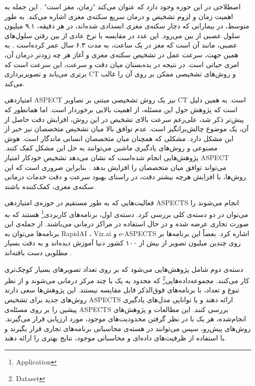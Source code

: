 اصطلاحی در این حوزه وجود دارد که عنوان می‌کند "زمان، مغز است" \cite{saver2006time}.
این جمله به اهمیت زمان و لزوم تشخیص و درمان سریع سکته‌ی مغزی اشاره می‌کند.
به طور متوسط، در بیمارانی که دچار سکته‌ی مغزی انسدادی شده‌اند، در هر دقیقه، ۹.۱ میلیون سلول عصبی از بین می‌رود.
این عدد در مقایسه با نرخ عادی از بین رفتن سلول‌های عصبی، مانند آن است که مغز در یک ساعت، به مدت ۶.۳ سال عمر کرده‌است \cite{saver2006time}.
به همین جهت، سرعت عمل در تشخیص سکته‌ی مغزی و آغاز هر چه زودتر درمان آن، امری حیاتی است.
در نتیجه در بده‌بستان میان دقت و سرعت، این سرعت است که برتری می‌یابد و تصویربرداری CT و روش‌های تشخیصی ممکن بر روی آن را غالب می‌کند.

امتیازدهی ASPECT نیز یک روش تشخیصی مبتنی بر تصاویر CT است.
به همین دلیل است که پژوهش حول این مسئله، از اهمیت بالایی برخوردار است.
اما همانطور که پیش‌تر ذکر شد، علی‌رغم سرعت بالای تشخیص در این روش، افزایش دقت حاصل از آن، یک موضوع چالش‌برانگیز است.
عدم توافق بالا میان تشخیص متخصصان نیز خبر از این مشکل دارد.
مشکلی که همچنان میان متخصصان انسانی ماندگار است.
هوش مصنوعی و روش‌های یادگیری ماشین می‌توانند به حل این مشکل کمک کنند.
پژوهش‌هایی انجام شده‌است
که نشان می‌دهد تشخیص خودکار امتیاز ASPECT می‌تواند توافق میان متخصصان را افزایش بدهد \cite{chen2022improving}.
بنابراین ضروری است که این روش‌ها، با افزایش هرچه بیشتر دقت، در راستای بهبود سرعت و دقت خدمات درمانی سکته‌ی مغزی، کمک‌کننده باشند.


فعالیت‌هایی که به طور مستقیم در حوزه‌ی امتیازدهی ASPECTS انجام می‌شوند را می‌توان در دو دسته‌ی کلی بررسی کرد.
دسته‌ی اول، 
برنامه‌های کاربردی\footnote{Application} هستند 
که به صورت تجاری عرضه شده و در حال استفاده در مراکز درمانی می‌باشند.
از جمله‌ی این برنامه‌ها می‌توان به RapidAI \cite{rapidai}،
 Viz.ai \cite{vizai} و e-ASPECTS \cite{brainomix} اشاره کرد.
بعضاً این برنامه‌ها بر روی چندین میلیون تصویر از بیش از ۱۰۰ کشور دنیا آموزش دیده‌اند
و به دقت بسیار مطلوبی دست یافته‌اند \cite{rapidai}.

دسته‌ی دوم شامل پژوهش‌هایی می‌شود که بر روی
تعداد تصویرهای بسیار کوچک‌تری کار می‌کنند.
مجموعه‌داده‌هایی\footnote{Dataset}
 که محدود به یک یا چند مرکز درمانی می‌شوند و از نظر تنوع و تعداد،‌ با برنامه‌های فوق‌الذکر قابل مقایسه نیستند.
این پژوهش‌ها سعی دارند روش‌های جدید برای تشخیص ASPECTS ارائه دهند و یا توانایی مدل‌های یادگیری پیشین را بر روی مسئله‌ی ASPECTS بررسی کنند.
 این مطالعات و پژوهش‌های انجام‌شده، هر یک با در نظر 
 گرفتن محدودیت‌های  موجود، مورد ارزیابی قرار 
 می‌گیرند.
روش‌های پیش‌رو، سپس می‌توانند در هسته‌ی محاسباتی برنامه‌های تجاری قرار بگیرند 
و با استفاده از ظرفیت‌های داده‌ای و محاسباتی موجود، نتایج بهتری را ارائه دهند.

